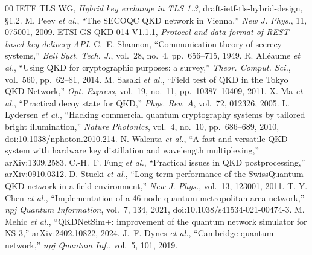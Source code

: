 \documentclass[conference]{IEEEtran}
\begin{document}
\begin{thebibliography}{00}
 IETF TLS WG, \emph{Hybrid key exchange in TLS 1.3}, draft-ietf-tls-hybrid-design, \S1.2.
 M. Peev \emph{et al.}, ``The SECOQC QKD network in Vienna,'' \emph{New J. Phys.}, 11, 075001, 2009.
 ETSI GS QKD 014 V1.1.1, \emph{Protocol and data format of REST-based key delivery API}.
 C.~E. Shannon, ``Communication theory of secrecy systems,'' \emph{Bell Syst. Tech. J.}, vol.~28, no.~4, pp.~656--715, 1949.
 R. All\'eaume \emph{et al.}, ``Using QKD for cryptographic purposes: a survey,'' \emph{Theor. Comput. Sci.}, vol.~560, pp.~62--81, 2014.
 M. Sasaki \emph{et al.}, ``Field test of QKD in the Tokyo QKD Network,'' \emph{Opt. Express}, vol.~19, no.~11, pp.~10387--10409, 2011.
 X. Ma \emph{et al.}, ``Practical decoy state for QKD,'' \emph{Phys. Rev. A}, vol.~72, 012326, 2005.
 L. Lydersen \emph{et al.}, ``Hacking commercial quantum cryptography systems by tailored bright illumination,'' \emph{Nature Photonics}, vol.~4, no.~10, pp.~686--689, 2010, doi:10.1038/nphoton.2010.214.
 N. Walenta \emph{et al.}, ``A fast and versatile QKD system with hardware key distillation and wavelength multiplexing,'' arXiv:1309.2583.
 C.-H.~F. Fung \emph{et al.}, ``Practical issues in QKD postprocessing,'' arXiv:0910.0312.
 D. Stucki \emph{et al.}, ``Long-term performance of the SwissQuantum QKD network in a field environment,'' \emph{New J. Phys.}, vol.~13, 123001, 2011.
 T.-Y. Chen \emph{et al.}, ``Implementation of a 46-node quantum metropolitan area network,'' \emph{npj Quantum Information}, vol.~7, 134, 2021, doi:10.1038/s41534-021-00474-3.
 M. Mehic \emph{et al.}, ``QKDNetSim+: improvement of the quantum network simulator for NS-3,'' arXiv:2402.10822, 2024.
 J.~F. Dynes \emph{et al.}, ``Cambridge quantum network,'' \emph{npj Quantum Inf.}, vol.~5, 101, 2019.
\end{thebibliography}
\end{document}

